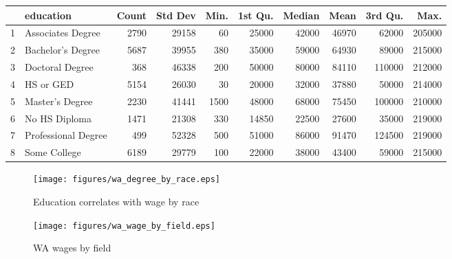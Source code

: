 \documentclass{exam}
\begin{document}
  \begin{table}[ht]
    \centering
    \begin{tabular}{rlrrrrrrrr}
      \toprule
         & education           & Count & Std Dev & Min. & 1st Qu. & Median & Mean  & 3rd Qu. & Max. \\
      \midrule
      1  & Associates Degree   & 2790  & 29158   & 60   & 25000   & 42000  & 46970 & 62000   & 205000 \\
      2  & Bachelor's Degree   & 5687  & 39955   & 380  & 35000   & 59000  & 64930 & 89000   & 215000 \\
      3  & Doctoral Degree     & 368   & 46338   & 200  & 50000   & 80000  & 84110 & 110000  & 212000 \\
      4  & HS or GED           & 5154  & 26030   & 30   & 20000   & 32000  & 37880 & 50000   & 214000 \\
      5  & Master's Degree     & 2230  & 41441   & 1500 & 48000   & 68000  & 75450 & 100000  & 210000 \\
      6  & No HS Diploma       & 1471  & 21308   & 330  & 14850   & 22500  & 27600 & 35000   & 219000 \\
      7  & Professional Degree & 499   & 52328   & 500  & 51000   & 86000  & 91470 & 124500  & 219000 \\
      8  & Some College        & 6189  & 29779   & 100  & 22000   & 38000  & 43400 & 59000   & 215000 \\
      \midrule
    \end{tabular}
  \end{table}

  \begin{figure}[H]
    \centering
    \texttt{[image: figures/wa\_degree\_by\_race.eps]}
    \caption{Education correlates with wage by race}
  \end{figure}

  \begin{figure}[H]
    \centering
    \texttt{[image: figures/wa\_wage\_by\_field.eps]}
    \caption{WA wages by field}
  \end{figure}
\end{document}
